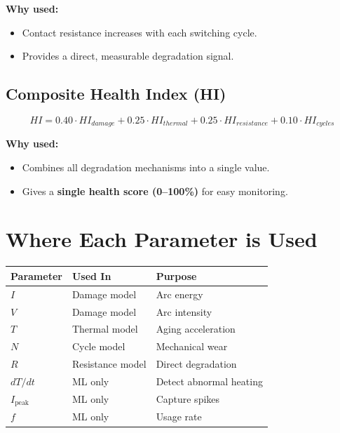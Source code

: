 \documentclass[12pt]{article}
\begin{document}
\textbf{Why used:}
\begin{itemize}
  \item Contact resistance increases with each switching cycle.
  \item Provides a direct, measurable degradation signal.
\end{itemize}


\subsection{Composite Health Index (HI)}

\[
HI =
0.40 \cdot HI_{damage}
+ 0.25 \cdot HI_{thermal}
+ 0.25 \cdot HI_{resistance}
+ 0.10 \cdot HI_{cycles}
\]

\textbf{Why used:}
\begin{itemize}
  \item Combines all degradation mechanisms into a single value.
  \item Gives a \textbf{single health score (0--100\%)} for easy monitoring.
\end{itemize}


\section{Where Each Parameter is Used}

\begin{table}[h]
\centering
\begin{tabular}{lll}
\toprule
Parameter & Used In & Purpose \\
\midrule
$I$ & Damage model & Arc energy \\
$V$ & Damage model & Arc intensity \\
$T$ & Thermal model & Aging acceleration \\
$N$ & Cycle model & Mechanical wear \\
$R$ & Resistance model & Direct degradation \\
$dT/dt$ & ML only & Detect abnormal heating \\
$I_{\text{peak}}$ & ML only & Capture spikes \\
$f$ & ML only & Usage rate \\
\bottomrule
\end{tabular}
\end{table}
\end{document}
